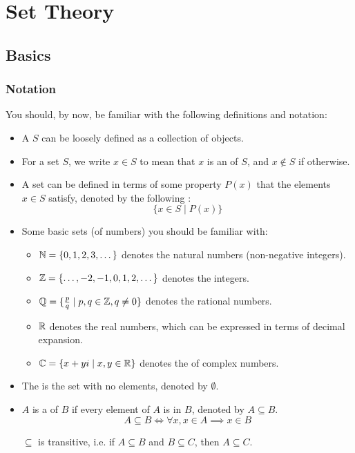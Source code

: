 \chapter{Set Theory}
\section{Basics}
\subsection{Notation}
You should, by now, be familiar with the following definitions and notation:
\begin{itemize}
\item A  $S$ can be loosely defined as a collection of objects.

\item For a set $S$, we write $x \in S$ to mean that $x$ is an  of $S$, and $x \notin S$ if otherwise.

\item A set can be defined in terms of some property $P(x)$ that the elements $x \in S$ satisfy, denoted by the following :
\[ \{x \in S \mid P(x)\} \]

\item Some basic sets (of numbers) you should be familiar with:
\begin{itemize}
\item $\mathbb N=\{0,1,2,3,\dots\}$ denotes the natural numbers (non-negative integers).
\item $\mathbb Z=\{\dots,-2,-1,0,1,2,\dots\}$ denotes the integers.
\item $\mathbb Q=\{\frac{p}{q} \mid p,q\in\mathbb Z, q\neq0\}$ denotes the rational numbers.
\item $\mathbb R$ denotes the real numbers, which can be expressed in terms of decimal expansion.
\item $\mathbb C=\{x+yi \mid x,y\in\mathbb R\}$ denotes the of complex numbers.
\end{itemize}

\item The  is the set with no elements, denoted by $\emptyset$.

\item $A$ is a  of $B$ if every element of $A$ is in $B$, denoted by $A \subseteq B$.
\[ A \subseteq B \iff \forall x, x\in A \implies x\in B \]

$\subseteq$ is transitive, i.e. if $A \subseteq B$ and $B \subseteq C$, then $A \subseteq C$.


\end{itemize}
